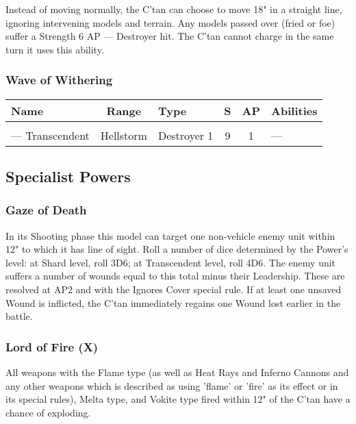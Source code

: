Instead of moving normally, the C'tan can choose to move 18" in a straight line, ignoring intervening models and terrain. Any models passed over (fried or foe) suffer a Strength 6 AP — Destroyer hit. The C'tan cannot charge in the same turn it uses this ability.

\subsubsection{Wave of Withering} \label{Wave of Withering}

\noindent
\begin{NiceTabular}{L{115 pt} c C{40pt} *{2}{c} >{\raggedright\arraybackslash}p{240pt}}
	Name & Range & Type & S & AP & Abilities \\
	\hline
	 &  &  &  &  & \\
	— Transcendent & Hellstorm & Destroyer 1 & 9 & 1 & — \\
\end{NiceTabular}

\subsection{Specialist Powers}

\subsubsection{Gaze of Death} \label{Gaze of Death}

In its Shooting phase this model can target one non-vehicle enemy unit within 12" to which it has line of sight. Roll a number of dice determined by the Power's level: at Shard level, roll 3D6; at Transcendent level, roll 4D6. The enemy unit suffers a number of wounds equal to this total minus their Leadership. These are resolved at AP2 and with the Ignores Cover special rule. If at least one unsaved Wound is inflicted, the C’tan immediately regains one Wound lost earlier in the battle.

\subsubsection{Lord of Fire (X)} \label{Lord of Fire}

All weapons with the Flame type (as well as Heat Rays and Inferno Cannons and any other weapons which is described as using 'flame' or 'fire' as its effect or in its special rules), Melta type, and Vokite type fired within 12" of the C'tan have a chance of exploding. 


